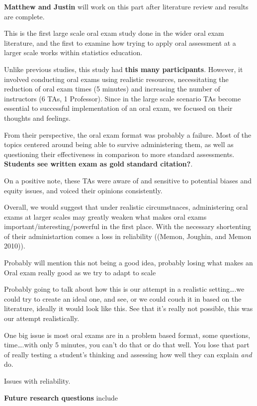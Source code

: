 \documentclass[
  letterpaper,
  DIV=11,
  numbers=noendperiod]{scrartcl}
\begin{document}
\textbf{Matthew and Justin} will work on this part after literature
review and results are complete.

This is the first large scale oral exam study done in the wider oral
exam literature, and the first to examine how trying to apply oral
assessment at a larger scale works within statistics education.

Unlike previous studies, this study had \textbf{this many participants}.
However, it involved conducting oral exams using realistic resources,
necessitating the reduction of oral exam times (5 minutes) and
increasing the number of instructors (6 TAs, 1 Professor). Since in the
large scale scenario TAs become essential to successful implementation
of an oral exam, we focused on their thoughts and feelings.

From their perspective, the oral exam format was probably a failure.
Most of the topics centered around being able to survive administering
them, as well as questioning their effectiveness in comparison to more
standard assessments. \textbf{Students see written exam as gold standard
citation?}.

On a positive note, these TAs were aware of and sensitive to potential
biases and equity issues, and voiced their opinions consistently.

Overall, we would suggest that under realistic circumstnaces,
administering oral exams at larger scales may greatly weaken what makes
oral exams important/interesting/powerful in the first place. With the
necessary shortenting of their administartion comes a loss in
reliability ((Memon, Joughin, and Memon 2010)).

Probably will mention this not being a good idea, probably losing what
makes an Oral exam really good as we try to adapt to scale

Probably going to talk about how this is our attempt in a realistic
setting\ldots.we could try to create an ideal one, and see, or we could
couch it in based on the literature, ideally it would look like this.
See that it's really not possible, this was our attempt realistically.

One big issue is most oral exams are in a problem based format, some
questions, time\ldots.with only 5 minutes, you can't do that or do that
well. You lose that part of really testing a student's thinking and
assessing how well they can explain \emph{and} do.

Issues with reliability.

\textbf{Future research questions} include
\end{document}
